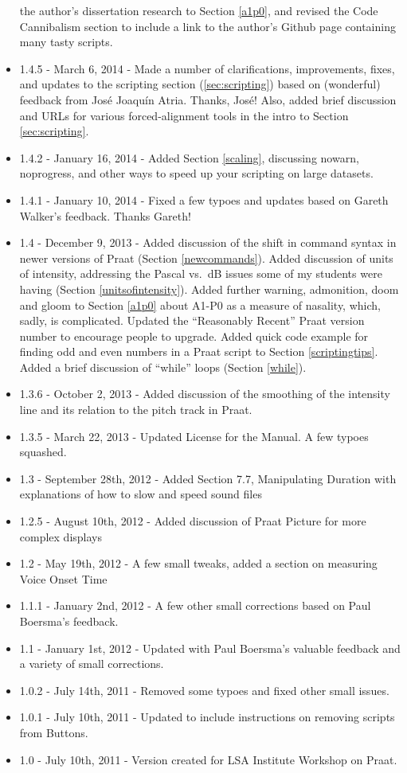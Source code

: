 \begin{itemize}
  the author's dissertation research to Section \ref{a1p0}, and revised
  the Code Cannibalism section to include a link to the author's Github
  page containing many tasty scripts.
\item
  1.4.5 - March 6, 2014 - Made a number of clarifications, improvements,
  fixes, and updates to the scripting section (\ref{sec:scripting})
  based on (wonderful) feedback from José Joaquín Atria. Thanks, José!
  Also, added brief discussion and URLs for various forced-alignment
  tools in the intro to Section \ref{sec:scripting}.
\item
  1.4.2 - January 16, 2014 - Added Section \ref{scaling}, discussing
  nowarn, noprogress, and other ways to speed up your scripting on large
  datasets.
\item
  1.4.1 - January 10, 2014 - Fixed a few typoes and updates based on
  Gareth Walker's feedback. Thanks Gareth!
\item
  1.4 - December 9, 2013 - Added discussion of the shift in command
  syntax in newer versions of Praat (Section \ref{newcommands}). Added
  discussion of units of intensity, addressing the Pascal vs.~dB issues
  some of my students were having (Section \ref{unitsofintensity}).
  Added further warning, admonition, doom and gloom to Section
  \ref{a1p0} about A1-P0 as a measure of nasality, which, sadly, is
  complicated. Updated the ``Reasonably Recent'' Praat version number to
  encourage people to upgrade. Added quick code example for finding odd
  and even numbers in a Praat script to Section \ref{scriptingtips}.
  Added a brief discussion of ``while'' loops (Section \ref{while}).
\item
  1.3.6 - October 2, 2013 - Added discussion of the smoothing of the
  intensity line and its relation to the pitch track in Praat.
\item
  1.3.5 - March 22, 2013 - Updated License for the Manual. A few typoes
  squashed.
\item
  1.3 - September 28th, 2012 - Added Section 7.7, Manipulating Duration
  with explanations of how to slow and speed sound files
\item
  1.2.5 - August 10th, 2012 - Added discussion of Praat Picture for more
  complex displays
\item
  1.2 - May 19th, 2012 - A few small tweaks, added a section on
  measuring Voice Onset Time
\item
  1.1.1 - January 2nd, 2012 - A few other small corrections based on
  Paul Boersma's feedback.
\item
  1.1 - January 1st, 2012 - Updated with Paul Boersma's valuable
  feedback and a variety of small corrections.
\item
  1.0.2 - July 14th, 2011 - Removed some typoes and fixed other small
  issues.
\item
  1.0.1 - July 10th, 2011 - Updated to include instructions on removing
  scripts from Buttons.
\item
  1.0 - July 10th, 2011 - Version created for LSA Institute Workshop on
  Praat.
\end{itemize}

